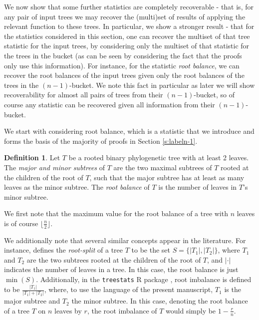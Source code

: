 \documentclass[12pt]{article}
\theoremstyle{definition}
\newtheorem{Definition}[Theorem]{Definition}
\begin{document}
We now show that some further statistics are completely recoverable - that is, for any pair of input trees we may recover the (multi)set of results of applying the relevant function to these trees. In particular, we show a stronger result - that for the statistics considered in this section, one can recover the multiset of that tree statistic for the input trees, by considering only the multiset of that statistic for the trees in the bucket (as can be seen by considering the fact that the proofs only use this information). For instance, for the statistic \emph{root balance}, we can recover the root balances of the input trees given only the root balances of the trees in the $(n-1)$-bucket. We note this fact in particular as later we will show recoverability for almost all pairs of trees from their $(n-1)$-bucket, so of course any statistic can be recovered given all information from their $(n-1)$-bucket.

We start with considering root balance, which is a statistic that we introduce and forms the basis of the majority of proofs in Section \ref{s:labeln-1}.

\begin{Definition}
    Let $T$ be a rooted binary phylogenetic tree with at least 2 leaves. The \emph{major and minor subtrees} of $T$ are the two maximal subtrees of $T$ rooted at the children of the root of $T$, such that the major subtree has at least as many leaves as the minor subtree. The \emph{root balance} of $T$ is the number of leaves in $T$'s minor subtree.
\end{Definition}

We first note that the maximum value for the root balance of a tree with $n$ leaves is of course $\lfloor \frac{n}{2} \rfloor$.

We additionally note that several similar concepts appear in the literature. For instance, \cite{Decks_of_rooted_binary_trees} defines the \emph{root-split} of a tree $T$ to be the set $S=\{|T_1|,|T_2|\}$, where $T_1$ and $T_2$ are the two subtrees rooted at the children of the root of $T$, and $| \cdot |$ indicates the number of leaves in a tree. In this case, the root balance is just $\min(S)$. Additionally, in the \texttt{treestats} R package \cite{janzen2024phylogenetic}, root imbalance is defined to be $\frac{|T_1|}{|T_1|+|T_2|}$, where, to use the language of the present manuscript, $T_1$ is the major subtree and $T_2$ the minor subtree. In this case, denoting the  root balance of a tree $T$ on $n$ leaves by $r$, the  root imbalance of $T$ would simply be $1-\frac{r}{n}$.
\end{document}
